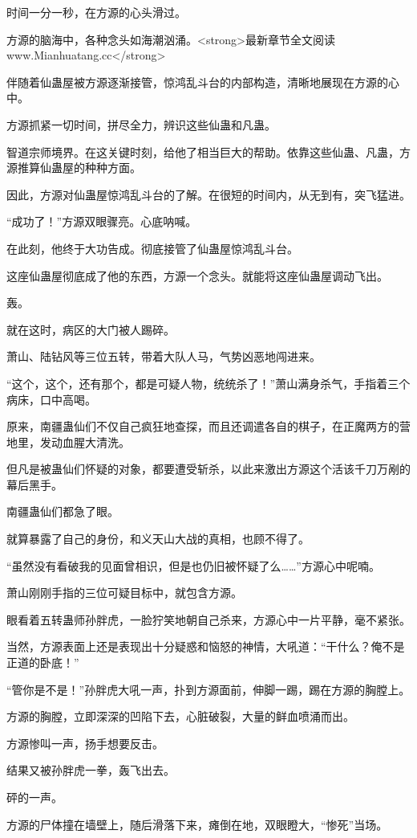\begin{this_body}
时间一分一秒，在方源的心头滑过。

方源的脑海中，各种念头如海潮汹涌。<strong>最新章节全文阅读www.Mianhuatang.cc</strong>

伴随着仙蛊屋被方源逐渐接管，惊鸿乱斗台的内部构造，清晰地展现在方源的心中。

方源抓紧一切时间，拼尽全力，辨识这些仙蛊和凡蛊。

智道宗师境界。在这关键时刻，给他了相当巨大的帮助。依靠这些仙蛊、凡蛊，方源推算仙蛊屋的种种方面。

因此，方源对仙蛊屋惊鸿乱斗台的了解。在很短的时间内，从无到有，突飞猛进。

“成功了！”方源双眼骤亮。心底呐喊。

在此刻，他终于大功告成。彻底接管了仙蛊屋惊鸿乱斗台。

这座仙蛊屋彻底成了他的东西，方源一个念头。就能将这座仙蛊屋调动飞出。

轰。

就在这时，病区的大门被人踢碎。

萧山、陆钻风等三位五转，带着大队人马，气势凶恶地闯进来。

“这个，这个，还有那个，都是可疑人物，统统杀了！”萧山满身杀气，手指着三个病床，口中高喝。

原来，南疆蛊仙们不仅自己疯狂地查探，而且还调遣各自的棋子，在正魔两方的营地里，发动血腥大清洗。

但凡是被蛊仙们怀疑的对象，都要遭受斩杀，以此来激出方源这个活该千刀万剐的幕后黑手。

南疆蛊仙们都急了眼。

就算暴露了自己的身份，和义天山大战的真相，也顾不得了。

“虽然没有看破我的见面曾相识，但是也仍旧被怀疑了么……”方源心中呢喃。

萧山刚刚手指的三位可疑目标中，就包含方源。

眼看着五转蛊师孙胖虎，一脸狞笑地朝自己杀来，方源心中一片平静，毫不紧张。

当然，方源表面上还是表现出十分疑惑和恼怒的神情，大吼道：“干什么？俺不是正道的卧底！”

“管你是不是！”孙胖虎大吼一声，扑到方源面前，伸脚一踢，踢在方源的胸膛上。

方源的胸膛，立即深深的凹陷下去，心脏破裂，大量的鲜血喷涌而出。

方源惨叫一声，扬手想要反击。

结果又被孙胖虎一拳，轰飞出去。

砰的一声。

方源的尸体撞在墙壁上，随后滑落下来，瘫倒在地，双眼瞪大，“惨死”当场。


\end{this_body}
